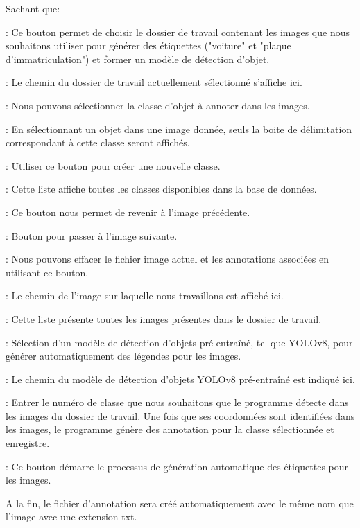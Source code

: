 Sachant que:
\begin{outline}

     :  Ce bouton permet de choisir le dossier de travail contenant les images que nous souhaitons utiliser pour générer des étiquettes ("voiture" et "plaque d'immatriculation") et former un modèle de détection d'objet.
    
     : Le chemin du dossier de travail actuellement sélectionné s'affiche ici.
    
     : Nous pouvons sélectionner la classe d'objet à annoter dans les images. 
    
    
     : En sélectionnant un objet dans une image donnée, seuls la boite de délimitation correspondant à cette classe seront affichés.
    
    
     : Utiliser ce bouton pour créer une nouvelle classe.
    
     : Cette liste affiche toutes les classes disponibles dans la base de données.
    
     : Ce bouton nous permet de revenir à l'image précédente.
    
     : Bouton pour passer à l'image suivante.
    
     : Nous pouvons effacer le fichier image actuel et les annotations associées en utilisant ce bouton.
    
     : Le chemin de l'image sur laquelle nous travaillons est affiché ici.
    
     : Cette liste présente toutes les images présentes dans le dossier de travail.
    
    
     : Sélection d'un modèle de détection d'objets pré-entraîné, tel que YOLOv8, pour générer automatiquement des légendes pour les images.
    
     : Le chemin du modèle de détection d'objets YOLOv8 pré-entraîné est indiqué ici.
    
     : Entrer le numéro de classe que nous souhaitons que le programme détecte dans les images du dossier de travail. Une fois que ses coordonnées sont identifiées dans les images, le programme génère des annotation pour la classe sélectionnée et enregistre.
    
     : Ce bouton démarre le processus de génération automatique des étiquettes pour les images. 

\end{outline}
A la fin, le fichier d'annotation sera créé automatiquement avec le même nom que l'image avec une extension txt.

